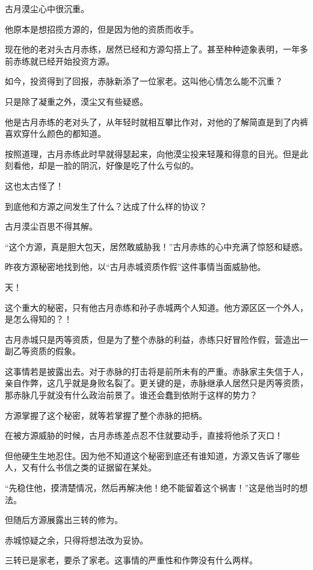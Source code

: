 
\begin{this_body}

古月漠尘心中很沉重。

他原本是想招揽方源的，但是因为他的资质而收手。

现在他的老对头古月赤练，居然已经和方源勾搭上了。甚至种种迹象表明，一年多前赤练就已经开始投资方源。

如今，投资得到了回报，赤脉新添了一位家老。这叫他心情怎么能不沉重？

只是除了凝重之外，漠尘又有些疑惑。

他是古月赤练的老对头了，从年轻时就相互攀比作对，对他的了解简直是到了内裤喜欢穿什么颜色的都知道。

按照道理，古月赤练此时早就得瑟起来，向他漠尘投来轻蔑和得意的目光。但是此刻看他，却是一脸的阴沉，好像是吃了什么亏似的。

这也太古怪了！

到底他和方源之间发生了什么？达成了什么样的协议？

古月漠尘百思不得其解。

“这个方源，真是胆大包天，居然敢威胁我！”古月赤练的心中充满了惊怒和疑惑。

昨夜方源秘密地找到他，以“古月赤城资质作假”这件事情当面威胁他。

天！

这个重大的秘密，只有他古月赤练和孙子赤城两个人知道。他方源区区一个外人，是怎么得知的？！

古月赤城只是丙等资质，但是为了整个赤脉的利益，赤练只好冒险作假，营造出一副乙等资质的假象。

这事情若是披露出去。对于赤脉的打击将是前所未有的严重。赤脉家主失信于人，亲自作弊，这几乎就是身败名裂了。更关键的是，赤脉继承人居然只是丙等资质，那赤脉几乎就没有什么政治前景了。谁还会蠢到依附于这样的势力？

方源掌握了这个秘密，就等若掌握了整个赤脉的把柄。

在被方源威胁的时候，古月赤练差点忍不住就要动手，直接将他杀了灭口！

但他硬生生地忍住。因为他不知道这个秘密到底还有谁知道，方源又告诉了哪些人，又有什么书信之类的证据留在某处。

“先稳住他，摸清楚情况，然后再解决他！绝不能留着这个祸害！”这是他当时的想法。

但随后方源展露出三转的修为。

赤城惊疑之余，只得将想法改为妥协。

三转已是家老，要杀了家老。这事情的严重性和作弊没有什么两样。


\end{this_body}
